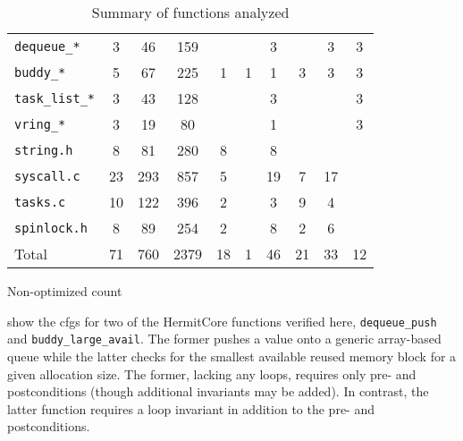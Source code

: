 \begin{table*}
  \renewcommand\theadalign{tc}
  \centering
  \begin{threeparttable}
    \caption{Summary of functions analyzed}
    \label{tbl:functions}
    \begin{tabular}{lSSSSSSSS S[table-figures-integer=2]}
      \toprule
       & {} & {} &
      {} & {} & {} &
      {} & {} & {} &
      {} \\
      \midrule
      \lstinline|dequeue_*| & 3 & 46 & 159 &&& 3 && 3 & 3 \\
      \lstinline|buddy_*| & 5 & 67 & 225 & 1 & 1 & 1 & 3 & 3 & 3 \\
      \lstinline|task_list_*| & 3 & 43 & 128 &&& 3 &&& 3 \\
      \lstinline|vring_*| & 3 & 19 & 80 &&& 1 &&& 3 \\
      \lstinline|string.h| & 8 & 81 & 280 & 8 && 8 &&& \\
      \lstinline|syscall.c| & 23 & 293 & 857 & 5 && 19 & 7 & 17 & \\
      \lstinline|tasks.c| & 10 & 122 & 396 & 2 && 3 & 9 & 4 & \\
      \lstinline|spinlock.h| & 8 & 89 & 254 & 2 && 8 & 2 & 6 & \\
      Total & 71 & 760 & 2379 & 18 & 1 & 46 & 21 & 33 & 12 \\
      \bottomrule
    \end{tabular}
    \begin{tablenotes}
      \item[\dag] Non-optimized count
    \end{tablenotes}
  \end{threeparttable}
\end{table*}

 show the \acp{cfg} for two of
the HermitCore functions verified here,
\lstinline|dequeue_push| and \lstinline|buddy_large_avail|.
The former pushes a value onto a generic array-based queue
while the latter checks for the smallest available reused memory block
for a given allocation size.
The former, lacking any loops, requires only pre- and postconditions
(though additional invariants may be added).
In contrast, the latter function
requires a loop invariant in addition to the pre- and postconditions.


